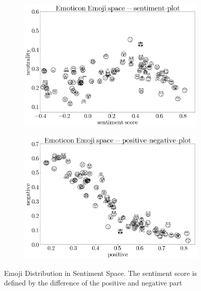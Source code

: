 \documentclass{article}
\begin{document}
\begin{figure}[h]
\centering
\begin{subfigure}{0.49\textwidth}
\centering
\includegraphics[width=0.9\linewidth]{images/Emoji-sn-plot.png}
\end{subfigure}
\begin{subfigure}{0.49\textwidth}
\centering
\includegraphics[width=0.9\linewidth]{images/Emoji-pn-plot.png}
\end{subfigure}
\caption{Emoji Distribution in Sentiment Space. The sentiment score is defined by the difference of the positive and negative part}
\label{fig:emoji_space}
\end{figure}
\end{document}

